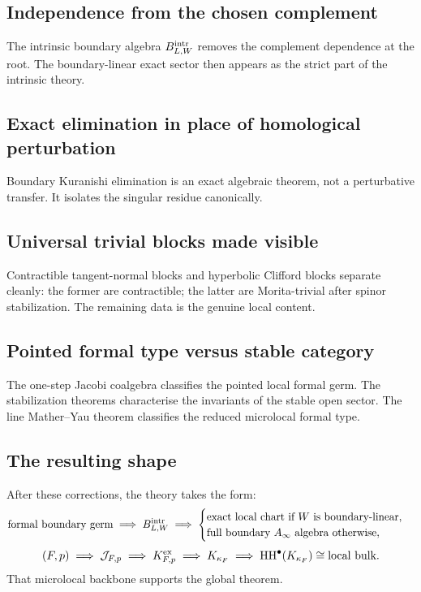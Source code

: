 \subsection*{Independence from the chosen complement}
The intrinsic boundary algebra $B^{\mathrm{intr}}_{L,W}$ removes the complement dependence at the root. The boundary-linear exact sector then appears as the strict part of the intrinsic theory.

\subsection*{Exact elimination in place of homological perturbation}
Boundary Kuranishi elimination is an exact algebraic theorem, not a perturbative transfer. It isolates the singular residue canonically.

\subsection*{Universal trivial blocks made visible}
Contractible tangent-normal blocks and hyperbolic Clifford blocks separate cleanly: the former are contractible; the latter are Morita-trivial after spinor stabilization. The remaining data is the genuine local content.

\subsection*{Pointed formal type versus stable category}
The one-step Jacobi coalgebra classifies the pointed local formal germ. The stabilization theorems characterise the invariants of the stable open sector. The line Mather--Yau theorem classifies the reduced microlocal formal type.

\subsection*{The resulting shape}

After these corrections, the theory takes the form:
\[
\text{formal boundary germ}
\;\Longrightarrow\;
B^{\mathrm{intr}}_{L,W}
\;\Longrightarrow\;
\begin{cases}
\text{exact local chart if $W$ is boundary-linear},\\
\text{full boundary $A_\infty$ algebra otherwise},
\end{cases}
\]
\[
(F,p)
\;\Longrightarrow\;
\mathcal J_{F,p}
\;\Longrightarrow\;
K^{\mathrm{ex}}_{F,p}
\;\Longrightarrow\;
K_{\kappa_F}
\;\Longrightarrow\;
\operatorname{HH}^\bullet(K_{\kappa_F})\cong \text{local bulk}.
\]
That microlocal backbone supports the global theorem.


